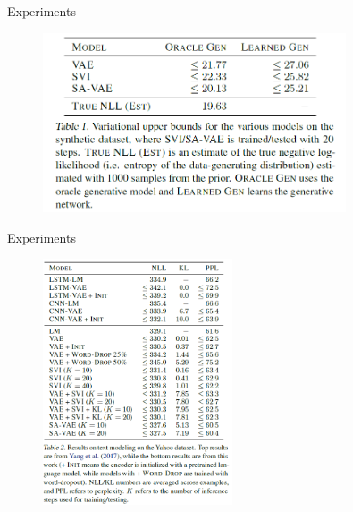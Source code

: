 \documentclass{beamer}		%
\begin{document}
\begin{frame}{Experiments}

\begin{figure}[t]
\includegraphics[width=0.8\textwidth]{figure7.png}
\label{fig1}
\end{figure}

\end{frame}



\begin{frame}{Experiments}

\begin{figure}[t]
\includegraphics[width=0.5\textwidth]{figure8.png}
\label{fig1}
\end{figure}

\end{frame}
\end{document}
